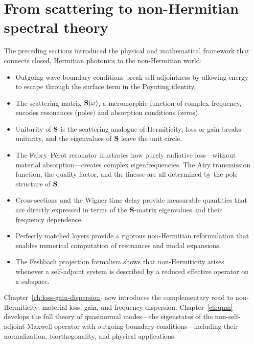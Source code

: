 \section{From scattering to non-Hermitian spectral theory}
\label{sec:ch4-forward}

The preceding sections introduced the physical and mathematical framework that
connects closed, Hermitian photonics to the non-Hermitian world:

\begin{itemize}
 \item Outgoing-wave boundary conditions break self-adjointness by
 allowing energy to escape through the surface term in the Poynting
 identity.
 \item The scattering matrix $\mathbf{S}(\omega)$, a meromorphic function of
 complex frequency, encodes resonances (poles) and absorption
 conditions (zeros).
 \item Unitarity of $\mathbf{S}$ is the scattering analogue of Hermiticity;
 loss or gain breaks unitarity, and the eigenvalues of $\mathbf{S}$
 leave the unit circle.
 \item The Fabry--P\'erot resonator illustrates how purely radiative
 loss---without material absorption---creates complex
 eigenfrequencies. The Airy transmission function, the quality
 factor, and the finesse are all determined by the pole structure
 of $\mathbf{S}$.
 \item Cross-sections and the Wigner time delay provide measurable
 quantities that are directly expressed in terms of the
 $\mathbf{S}$-matrix eigenvalues and their frequency dependence.
 \item Perfectly matched layers provide a rigorous non-Hermitian
 reformulation that enables numerical computation of resonances
 and modal expansions.
 \item The Feshbach projection formalism shows that non-Hermiticity
 arises whenever a self-adjoint system is described by a reduced
 effective operator on a subspace.
\end{itemize}

Chapter~\ref{ch:loss-gain-dispersion} now introduces the complementary
road to non-Hermiticity: material loss, gain, and frequency dispersion.
Chapter~\ref{ch:qnm} develops the full theory of quasinormal modes---the
eigenstates of the non-self-adjoint Maxwell operator with outgoing
boundary conditions---including their normalization, biorthogonality, and
physical applications.
